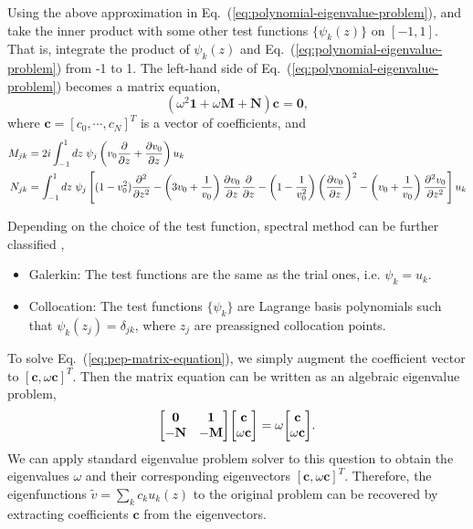 Using the above approximation in Eq.~(\ref{eq:polynomial-eigenvalue-problem}), and take the inner product with some other test functions $\{\psi_k(z)\}$ on $[-1,1]$. That is, integrate the product of $\psi_k(z)$ and Eq.~(\ref{eq:polynomial-eigenvalue-problem}) from -1 to 1. The left-hand side of Eq.~(\ref{eq:polynomial-eigenvalue-problem}) becomes a matrix equation,
\begin{equation}
	(\omega^2\mathbf{1} + \omega\mathbf{M} + \mathbf{N})\mathbf{c} = \mathbf{0},
	\label{eq:pep-matrix-equation}
\end{equation}
where $\mathbf{c} = [c_0, \cdots, c_N]^T$ is a vector of coefficients, and
\begin{align}
	M_{jk} & = 2i\int_{-1}^{1}dz \; \psi_{j}\left(v_0\pdv{}{z} +\pdv{v_0}{z} \right)u_{k}
	\label{eq:operator-matrix-M}                                                          \\
	N_{jk} & = \int_{-1}^{1}dz \; \psi_{j} \left[(1-v_0^2)\pdv[2]{}{z}
		-\left(3v_0 + \frac{1}{v_0}\right)\pdv{v_0}{z}\pdv{}{z}
		- \left(1-\frac{1}{v_0^2}\right)\left(\pdv{v_0}{z}\right)^2
		- \left(v_0+\frac{1}{v_0}\right)\pdv[2]{v_0}{z}\right] u_{k}
	\label{eq:operator-matrix-N}
\end{align}

Depending on the choice of the test function, spectral method can be further classified \cite{shen_tang_etal_spectral_2011},
\begin{itemize}
	\item Galerkin: The test functions are the same as the trial ones, i.e. $\psi_k=u_k$.
	\item Collocation:  The test functions $\{\psi_k\}$ are Lagrange basis polynomials such that $\psi_k(z_j)=\delta_{jk}$, where ${z_j}$ are preassigned collocation points.
\end{itemize}

To solve Eq.~(\ref{eq:pep-matrix-equation}), we simply augment the coefficient vector to $[\mathbf{c}, \omega\mathbf{c}]^T$. Then the matrix equation can be written as an algebraic eigenvalue problem,
\begin{equation} \label{eq:eigenvalue-problem}
	\mqty[ \mathbf{0} & \mathbf{1}\\ -\mathbf{N} & -\mathbf{M} ]\mqty[ \mathbf{c}\\ \omega\mathbf{c}] = \omega\mqty[ \mathbf{c}\\ \omega\mathbf{c}].
\end{equation}
We can apply standard eigenvalue problem solver to this question to obtain the eigenvalues $\omega$ and their corresponding eigenvectors $[\mathbf{c}, \omega\mathbf{c}]^T$. Therefore, the eigenfunctions $\tilde{v} = \sum_k c_ku_k(z)$ to the original problem can be recovered by extracting coefficients $\mathbf{c}$ from the eigenvectors.

